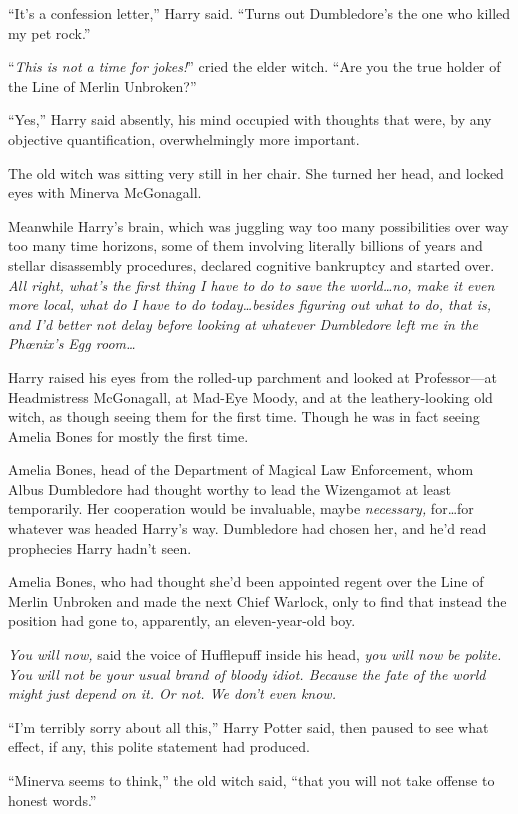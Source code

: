 “It’s a confession letter,” Harry said. “Turns out Dumbledore’s the one who killed my pet rock.”

“\emph{This is not a time for jokes!}” cried the elder witch. “Are you the true holder of the Line of Merlin Unbroken?”

“Yes,” Harry said absently, his mind occupied with thoughts that were, by any objective quantification, overwhelmingly more important.

The old witch was sitting very still in her chair. She turned her head, and locked eyes with Minerva McGonagall.

Meanwhile Harry’s brain, which was juggling way too many possibilities over way too many time horizons, some of them involving literally billions of years and stellar disassembly procedures, declared cognitive bankruptcy and started over. \emph{All right, what’s the \emph{first} thing I have to do to save the world…no, make it even more local, what do I have to do \emph{today}…besides figuring out what to do, that is, and I’d better not delay before looking at whatever Dumbledore left me in the Phœnix’s Egg room…}

Harry raised his eyes from the rolled-up parchment and looked at Professor—at Headmistress McGonagall, at Mad-Eye Moody, and at the leathery-looking old witch, as though seeing them for the first time. Though he was in fact seeing Amelia Bones for mostly the first time.

Amelia Bones, head of the Department of Magical Law Enforcement, whom Albus Dumbledore had thought worthy to lead the Wizengamot at least temporarily. Her cooperation would be invaluable, maybe \emph{necessary,} for…for whatever was headed Harry’s way. Dumbledore had chosen her, and he’d read prophecies Harry hadn’t seen.

Amelia Bones, who had thought she’d been appointed regent over the Line of Merlin Unbroken and made the next Chief Warlock, only to find that instead the position had gone to, apparently, an eleven-year-old boy.

\emph{You will now,} said the voice of Hufflepuff inside his head, \emph{you will now be polite. You will not be your usual brand of bloody idiot. Because the fate of the world might just depend on it. Or not. We don’t even know.}

“I’m terribly sorry about all this,” Harry Potter said, then paused to see what effect, if any, this polite statement had produced.

“Minerva seems to think,” the old witch said, “that you will not take offense to honest words.”

